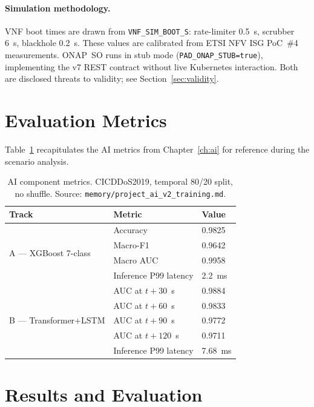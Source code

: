 \paragraph{Simulation methodology.}
VNF boot times are drawn from \texttt{VNF\_SIM\_BOOT\_S}: rate-limiter
0.5~s, scrubber 6~s, blackhole 0.2~s. These values are calibrated from
ETSI NFV ISG PoC~\#4 measurements. ONAP~SO runs in stub mode
(\texttt{PAD\_ONAP\_STUB=true}), implementing the v7 REST contract without
live Kubernetes interaction. Both are disclosed threats to validity;
see Section~\ref{sec:validity}.

\section{Evaluation Metrics}
\label{sec:metrics}

Table~\ref{tab:ai-metrics} recapitulates the AI metrics from Chapter~\ref{ch:ai}
for reference during the scenario analysis.

\begin{table}[H]
\centering
\small
\caption{AI component metrics. CICDDoS2019, temporal 80/20 split,
no shuffle. Source: \texttt{memory/project\_ai\_v2\_training.md}.}
\label{tab:ai-metrics}
\begin{tabular}{@{}lll@{}}
\toprule
Track & Metric & Value \\
\midrule
\multirow{4}{*}{A --- XGBoost 7-class}
  & Accuracy              & 0.9825 \\
  & Macro-F1              & 0.9642 \\
  & Macro AUC             & 0.9958 \\
  & Inference P99 latency & 2.2~ms \\
\midrule
\multirow{5}{*}{B --- Transformer+LSTM}
  & AUC at $t{+}30$~s    & 0.9884 \\
  & AUC at $t{+}60$~s    & 0.9833 \\
  & AUC at $t{+}90$~s    & 0.9772 \\
  & AUC at $t{+}120$~s   & 0.9711 \\
  & Inference P99 latency & 7.68~ms \\
\bottomrule
\end{tabular}
\end{table}

\section{Results and Evaluation}
\label{sec:results}

